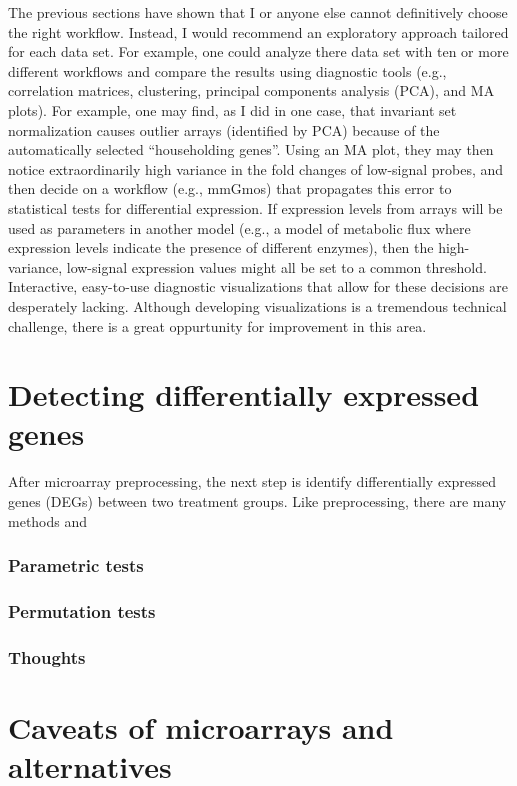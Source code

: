 The previous sections have shown that I or anyone
else cannot definitively choose the right workflow. 
Instead, I would recommend an exploratory approach 
tailored for each data set.
For example, one could analyze there data set with ten 
or more different workflows and compare the results
using diagnostic tools (e.g., correlation matrices, clustering,
principal components analysis (PCA), and MA plots).
For example, one may find, as I did in one case, that invariant set
normalization causes outlier arrays (identified by PCA) because
of the automatically selected ``householding genes''.
Using an MA plot, they may then notice extraordinarily
high variance in the fold changes of low-signal probes, and then decide
on a workflow (e.g., mmGmos) that propagates this error to
statistical tests for differential expression. If expression levels
from arrays will be used as parameters in another model (e.g., a model
of metabolic flux where expression levels indicate the presence of 
different enzymes), then the high-variance, low-signal expression values
might all be set to a common threshold.
Interactive, easy-to-use diagnostic visualizations that allow for these
decisions are desperately lacking.
Although developing visualizations is a tremendous technical challenge,
there is a great oppurtunity for improvement in this area.

\section[Differential expression]{Detecting differentially expressed genes}

After microarray preprocessing, the next step is identify differentially
expressed genes (DEGs) between two treatment groups. Like preprocessing,
there are many methods and 

\subsubsection{Parametric tests}

\subsubsection{Permutation tests}

\subsubsection{Thoughts}

\section{Caveats of microarrays and alternatives}

